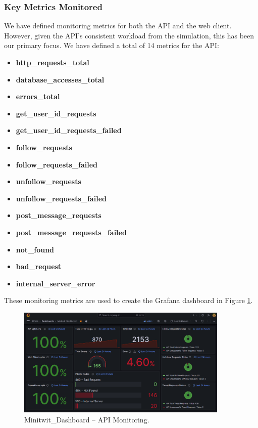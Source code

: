 \subsubsection*{Key Metrics Monitored}
We have defined monitoring metrics for both the API and the web client. However, given the API's consistent workload from the simulation, this has been our primary focus. We have defined a total of 14 metrics for the API:
\begin{multicols}{2}
\begin{itemize}
    \item \textbf{http\_requests\_total}
    \item \textbf{database\_accesses\_total}
    \item \textbf{errors\_total}
    \item \textbf{get\_user\_id\_requests}
    \item \textbf{get\_user\_id\_requests\_failed}
    \item \textbf{follow\_requests}
    \item \textbf{follow\_requests\_failed}
    \item \textbf{unfollow\_requests}
    \item \textbf{unfollow\_requests\_failed}
    \item \textbf{post\_message\_requests}
    \item \textbf{post\_message\_requests\_failed}
    \item \textbf{not\_found}
    \item \textbf{bad\_request}
    \item \textbf{internal\_server\_error}
\end{itemize}
\end{multicols}

These monitoring metrics are used to create the Grafana dashboard in Figure \ref{fig:monitor_good}. 

\begin{figure}[H]
    \centering
    \includegraphics[width=0.9\textwidth]{images/monitor_good.png}
    \caption{Minitwit\_Dashboard -- API Monitoring.}
    \label{fig:monitor_good}
\end{figure}

